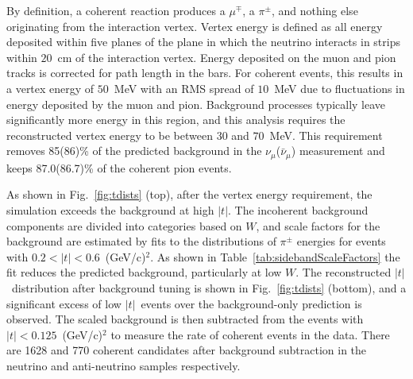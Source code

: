 \documentclass[aps,prl,twocolumn,showpacs,superscriptaddress,nofootinbib]{revtex4}
\newcommand{\numu}{\ensuremath{\nu_{\mu}}\xspace}
\newcommand{\numubar}{\ensuremath{\bar{\nu}_{\mu}}\xspace}
\newcommand{\tcoh}{\ensuremath{\left| t\right| \xspace}}
\begin{document}
By definition, a coherent reaction produces a $\mu^\mp$, a $\pi^\pm$, and
nothing else originating from the interaction vertex.  Vertex energy is defined as all energy deposited within five planes of the plane in which
the neutrino interacts in strips within $20$~cm of the interaction
vertex.  Energy deposited on the muon and pion tracks is corrected
for path length in the bars.  For coherent events, this results in a vertex energy
of $50$~MeV with an RMS spread of $10$~MeV due to fluctuations in
energy deposited by the muon and pion.  Background processes typically
 leave significantly more energy in this region, and this analysis
requires the reconstructed vertex energy to be between $30$ and
$70$~MeV.  This requirement removes 85(86)\% of the predicted
background in the $\numu$($\numubar$) measurement and keeps
87.0(86.7)\% of the coherent pion events.

As shown in Fig.~\ref{fig:tdists} (top), after the vertex energy requirement, the simulation exceeds the background at high \tcoh.  
The incoherent background components are divided into categories based on $W$, and scale factors for the background are estimated by fits to
the distributions of $\pi^\pm$ energies
for events with $0.2<\tcoh<0.6$~(GeV/c)$^2$. As shown in Table~\ref{tab:sidebandScaleFactors} the fit reduces the predicted background, particularly at low $W$. The reconstructed \tcoh\ distribution after background tuning is shown in Fig.~\ref{fig:tdists} (bottom), and a significant excess of low \tcoh\ events over the background-only prediction is observed.
The scaled background is
then subtracted from the events with $\tcoh<0.125$~(GeV/c)$^2$ to measure
the rate of coherent events in the data.  There are 1628 and 770 coherent candidates after background
subtraction in the neutrino and anti-neutrino samples respectively. 
\end{document}
